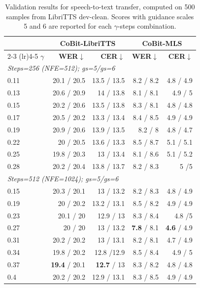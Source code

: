 \begin{table}[t]
\centering
\footnotesize
\setlength{\tabcolsep}{4pt}
\begin{tabular}{l rrrr}
\toprule
 & \multicolumn{2}{c}{\textbf{CoBit-LibriTTS}} & \multicolumn{2}{c}{\textbf{CoBit-MLS}} \\
\cmidrule(lr){2-3} \cmidrule(lr){4-5}
$\gamma$ & \textbf{WER}$\downarrow$ & \textbf{CER}$\downarrow$  & \textbf{WER}$\downarrow$ & \textbf{CER}$\downarrow$ \\
\midrule
\multicolumn{5}{l}{\emph{Steps=256 (NFE=512); gs=5/gs=6}} \\
0.11 & 20.1 / 20.5 & 13.5 / 13.5 & 8.2 / 8.2 & 4.8 / 4.9 \\
0.13 & 20.6 / 20.9 & 14 / 13.8 & 8.1 / 8.1 & 4.9 / 5 \\
0.15 & 20.2 / 20.6 & 13.5 / 13.8 & 8.3 / 8.1 & 4.8 / 4.8 \\
0.17 & 20.5 / 20.2 & 13.3 / 13.4 & 8.4 / 8.5 & 4.9 / 4.9 \\
0.19 & 20.9 / 20.6 & 13.9 / 13.5 & 8.2 / 8 & 4.8 / 4.7 \\
0.22 & 20 / 20.5 & 13.6 / 13.3 & 8.5 / 8.7 & 5.1 / 5.1 \\
0.25 & 19.8 / 20.3 & 13 / 13.4 & 8.1 / 8.6 & 5.1 / 5.2 \\
0.28 & 20.2 / 20.4 & 13.8 / 13.7 & 8.2 / 8.3 & 5 /5 \\
\midrule
\multicolumn{5}{l}{\emph{Steps=512 (NFE=1024); gs=5/gs=6}} \\
0.15 & 20.3 / 20.1 & 13 / 13.2 & 8.2 / 8.3 & 4.8 / 4.9 \\
0.19 & 20 / 20.2 & 13.2 / 13.1 & 8.5 / 8.2 & 4.9 / 4.9 \\
0.23 & 20.1 / 20 & 12.9 / 13 & 8.3 / 8.4 & 4.8 /5\\
0.27 & 20 / 20 & 13 / 13.2 & \textbf{7.8} / 8.1 & \textbf{4.6} / 4.9 \\
0.31 & 20.2 / 20.2 & 13 / 13.1 & 8.2 / 8.1 & 4.7 / 4.9 \\
0.34 & 19.8 / 20.2 & 12.8 /12.9 & 8.5 / 8.4 & 4.9 / 5\\
0.37 & \textbf{19.4} / 20.1 & \textbf{12.7} / 13 & 8.3 / 8.2 & 4.8 / 4.8 \\
0.4 & 20.2 / 20.2 & 12.9 / 13.1 & 8.3 / 8.5 & 4.9 / 4.9 \\
\bottomrule
\end{tabular}
\caption{Validation results for speech-to-text transfer, computed on 500 samples from LibriTTS dev-clean. Scores with guidance scales 5 and 6 are reported for each $\gamma$-steps combination.}
\label{tab:audio:val:stt}
\end{table}

